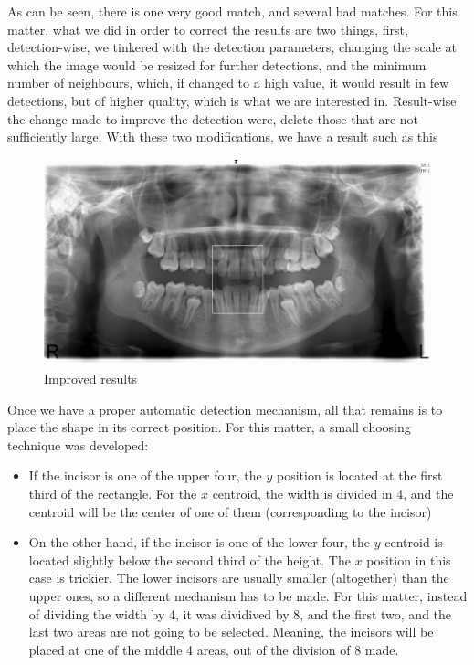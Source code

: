 As can be seen, there is one very good match, and several bad matches. For this
matter, what we did in order to correct the results are two things, 
first, detection-wise, we tinkered with the detection parameters, changing the
scale at which the image would be resized for further detections, and the
minimum number of neighbours, which, if changed to a high value, it would result
in few detections, but of higher quality, which is what we are interested in.
Result-wise the change made to improve the detection were, 
delete those that are not sufficiently large. 
With these two modifications, we have a result such as
this

\begin{figure}[h]
  \centering
  \includegraphics[height=6cm]{img/teeth_detection_2}
  \caption{Improved results}
\end{figure}

Once we have a proper automatic detection mechanism, all that remains is to place
the shape in its correct position. For this matter, a small choosing technique
was developed:
\begin{itemize}
  \item If the incisor is one of the upper four, the $y$ position is located at
the first third of the rectangle. For the $x$ centroid, the width is divided in 4,
and the centroid will be the center of one of them (corresponding to the
incisor)
  \item On the other hand, if the incisor is one of the lower four, the $y$
centroid is located slightly below the second third of the height. The $x$
position in this case is trickier. The lower incisors are usually smaller
(altogether) than the upper ones, so a different mechanism has to be made. For
this matter, instead of dividing the width by 4, it was dividived by 8, and the
first two, and the last two areas are not going to be selected. Meaning, the
incisors will be placed at one of the middle 4 areas, out of the division of 8
made.  
\end{itemize}
